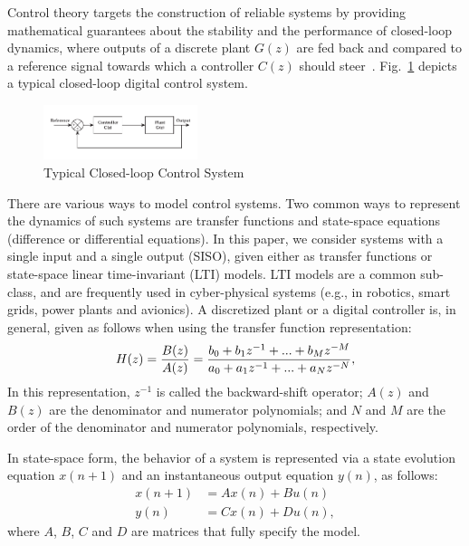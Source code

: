 \documentclass[10pt,conference]{IEEEtran}
\begin{document}
Control theory targets the construction of reliable systems by providing
mathematical guarantees about the stability and the performance of
closed-loop dynamics, where outputs of a discrete plant $G(z)$ are fed back
and compared to a reference signal towards which a controller $C(z)$ should
steer~\cite{astrom1997computer}.  Fig.~\ref{fig:typical-control-system}
depicts a typical closed-loop digital control system.
%
\begin{figure}[ht!]
\centering
\includegraphics[width=0.4\textwidth]{closedloopseries.pdf}
\caption{Typical Closed-loop Control System}
\label{fig:typical-control-system}
\end{figure}


There are various ways to model control systems.  Two common ways to
represent the dynamics of such systems are transfer functions and
state-space equations (difference or differential equations).  In this
paper, we consider systems with a single input and a single output (SISO),
given either as transfer functions or state-space linear time-invariant
(LTI) models.  LTI models are a common sub-class, and are frequently used in
cyber-physical systems (e.g., in robotics, smart grids, power plants and
avionics).  A discretized plant or a digital controller is, in general,
given as follows when using the transfer function representation:
%
\begin{equation}
\small
\label{eq:transferfunction}
H(z)=\frac{B(z)}{A(z)}=\frac{b_{0}+b_{1}z^{-1}+...+b_{M}z^{-M}}{a_{0}+a_{1}z^{-1}+...+a_{N}z^{-N}},
\end{equation}
%
In this representation, $z^{-1}$ is called the backward-shift operator;
$A(z)$ and $B(z)$ are the denominator and numerator polynomials; and $N$ and
$M$ are the order of the denominator and numerator polynomials, respectively.

In state-space form, the behavior of a system is represented via a state
evolution equation $x(n+1)$ and an instantaneous output equation $y(n)$, as
follows:
%
\begin{equation}
\begin{split}
x(n+1) &= A x(n) + B u(n)
\\
y(n) &= C x(n) + D u(n), 
\end{split}\label{eq:ss-example}
\end{equation}
%
where $A$, $B$, $C$ and $D$ are matrices that fully specify the model. 
\end{document}
